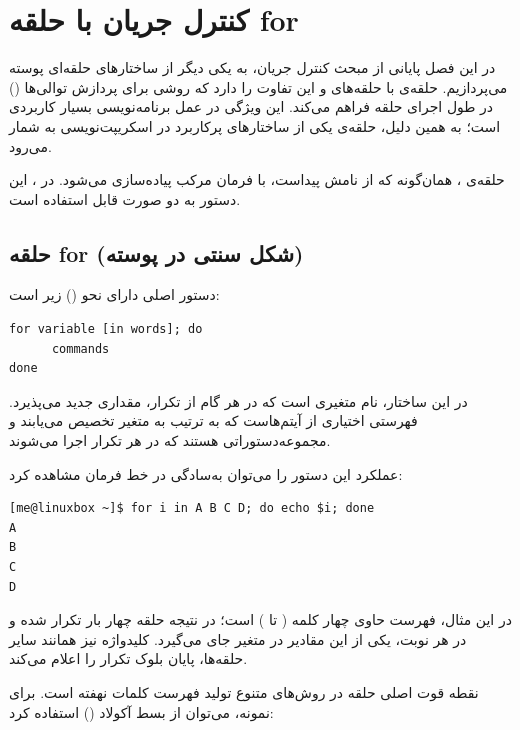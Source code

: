 \chapter{کنترل جریان با حلقه for}

در این فصل پایانی از مبحث کنترل جریان، به یکی دیگر از ساختارهای حلقه‌ای پوسته می‌پردازیم. حلقه‌ی  با حلقه‌های  و  این تفاوت را دارد که روشی برای پردازش توالی‌ها () در طول اجرای حلقه فراهم می‌کند. این ویژگی در عمل برنامه‌نویسی بسیار کاربردی است؛ به همین دلیل، حلقه‌ی  یکی از ساختارهای پرکاربرد در اسکریپت‌نویسی  به شمار می‌رود.

حلقه‌ی ، همان‌گونه که از نامش پیداست، با فرمان مرکب  پیاده‌سازی می‌شود. در ، این دستور به دو صورت قابل استفاده است.

\section{حلقه for (شکل سنتی در پوسته)}

دستور اصلی  دارای نحو () زیر است:

\begin{latin}
\begin{lstlisting}
for variable [in words]; do
      commands
done
\end{lstlisting}
\end{latin}

در این ساختار،  نام متغیری است که در هر گام از تکرار، مقداری جدید می‌پذیرد.  فهرستی اختیاری از آیتم‌هاست که به ترتیب به متغیر تخصیص می‌یابند و  مجموعه‌دستوراتی هستند که در هر تکرار اجرا می‌شوند.

عملکرد این دستور را می‌توان به‌سادگی در خط فرمان مشاهده کرد:

\begin{latin}
\begin{lstlisting}
[me@linuxbox ~]$ for i in A B C D; do echo $i; done
A
B
C
D
\end{lstlisting}
\end{latin}

در این مثال، فهرست حاوی چهار کلمه ( تا ) است؛ در نتیجه حلقه چهار بار تکرار شده و در هر نوبت، یکی از این مقادیر در متغیر  جای می‌گیرد. کلیدواژه  نیز همانند سایر حلقه‌ها، پایان بلوک تکرار را اعلام می‌کند.

نقطه قوت اصلی حلقه  در روش‌های متنوع تولید فهرست کلمات نهفته است. برای نمونه، می‌توان از بسط آکولاد () استفاده کرد:

